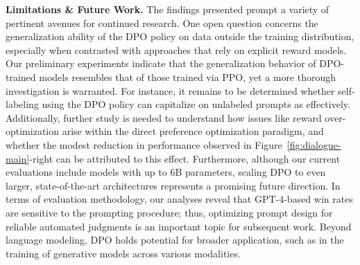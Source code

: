\textbf{Limitations \& Future Work.} The findings presented prompt a variety of pertinent avenues for continued research. One open question concerns the generalization ability of the DPO policy on data outside the training distribution, especially when contrasted with approaches that rely on explicit reward models. Our preliminary experiments indicate that the generalization behavior of DPO-trained models resembles that of those trained via PPO, yet a more thorough investigation is warranted. For instance, it remains to be determined whether self-labeling using the DPO policy can capitalize on unlabeled prompts as effectively. Additionally, further study is needed to understand how issues like reward over-optimization arise within the direct preference optimization paradigm, and whether the modest reduction in performance observed in Figure~\ref{fig:dialogue-main}-right can be attributed to this effect. Furthermore, although our current evaluations include models with up to 6B parameters, scaling DPO to even larger, state-of-the-art architectures represents a promising future direction. In terms of evaluation methodology, our analyses reveal that GPT-4-based win rates are sensitive to the prompting procedure; thus, optimizing prompt design for reliable automated judgments is an important topic for subsequent work. Beyond language modeling, DPO holds potential for broader application, such as in the training of generative models across various modalities.

